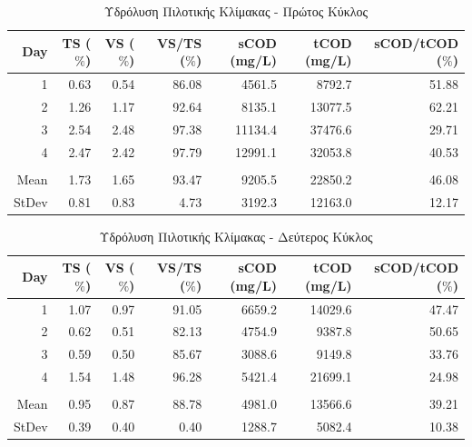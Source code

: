 \documentclass[11pt]{report}
\begin{document}
\begin{table}[htbp]
\caption{\label{tab:orge47c15e}Υδρόλυση Πιλοτικής Κλίμακας - Πρώτος Κύκλος}
\centering
\begin{tabular}{rrrrrrr}
Day & TS (\(\%\)) & VS (\(\%\)) & VS/TS (\(\%\)) & sCOD (mg/L) & tCOD (mg/L) & sCOD/tCOD (\(\%\))\\[0pt]
\hline
1 & 0.63 & 0.54 & 86.08 & 4561.5 & 8792.7 & 51.88\\[0pt]
2 & 1.26 & 1.17 & 92.64 & 8135.1 & 13077.5 & 62.21\\[0pt]
3 & 2.54 & 2.48 & 97.38 & 11134.4 & 37476.6 & 29.71\\[0pt]
4 & 2.47 & 2.42 & 97.79 & 12991.1 & 32053.8 & 40.53\\[0pt]
 &  &  &  &  &  & \\[0pt]
Mean & 1.73 & 1.65 & 93.47 & 9205.5 & 22850.2 & 46.08\\[0pt]
StDev & 0.81 & 0.83 & 4.73 & 3192.3 & 12163.0 & 12.17\\[0pt]
\end{tabular}
\end{table}

\begin{table}[htbp]
\caption{\label{tab:org41fe875}Υδρόλυση Πιλοτικής Κλίμακας - Δεύτερος Κύκλος}
\centering
\begin{tabular}{rrrrrrr}
Day & TS (\(\%\)) & VS (\(\%\)) & VS/TS (\(\%\)) & sCOD (mg/L) & tCOD (mg/L) & sCOD/tCOD (\(\%\))\\[0pt]
\hline
1 & 1.07 & 0.97 & 91.05 & 6659.2 & 14029.6 & 47.47\\[0pt]
2 & 0.62 & 0.51 & 82.13 & 4754.9 & 9387.8 & 50.65\\[0pt]
3 & 0.59 & 0.50 & 85.67 & 3088.6 & 9149.8 & 33.76\\[0pt]
4 & 1.54 & 1.48 & 96.28 & 5421.4 & 21699.1 & 24.98\\[0pt]
 &  &  &  &  &  & \\[0pt]
Mean & 0.95 & 0.87 & 88.78 & 4981.0 & 13566.6 & 39.21\\[0pt]
StDev & 0.39 & 0.40 & 0.40 & 1288.7 & 5082.4 & 10.38\\[0pt]
\end{tabular}
\end{table}
\end{document}
